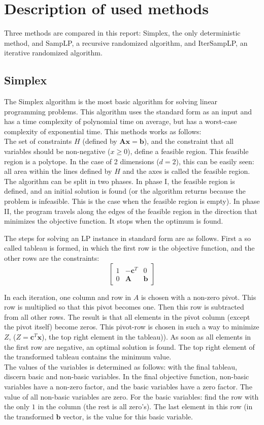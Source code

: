 \documentclass[nocopyrightspace]{acm_proc_article-sp}
\begin{document}
\section{Description of used methods}
Three methods are compared  in this report: Simplex, the only deterministic method, and SampLP, a recursive randomized algorithm, and IterSampLP, an iterative randomized algorithm.
\subsection{Simplex}
The Simplex algorithm \cite{dantzig1951maximization} is the most basic algorithm for solving linear programming problems. This algorithm uses the standard form as an input and has a time complexity of polynomial time on average, but has a worst-case complexity of exponential time. This methods works as follows: \\
The set of constraints $H$ (defined by $\mathbf{Ax} = \mathbf{b}$), and the constraint that all variables should be non-negative ($x \geq 0$), define a feasible region. This feasible region is a polytope. In the case of 2 dimensions ($d=2$), this can be easily seen: all area within the lines defined by $H$ and the axes is called the feasible region. \\
The algorithm can be split in two phases. In phase I, the feasible region is defined, and an initial solution is found (or the algorithm returns because the problem is infeasible. This is the case when the feasible region is empty). In phase II, the program travels along the edges of the feasible region in the direction that minimizes the objective function. It stops when the optimum is found.

The steps for solving an LP instance in standard form are as follows. First a so called tableau is formed, in which the first row is the objective function, and the other rows are the constraints:
\[
\begin{bmatrix}
1 & -\mathbf{c}^T & 0 \\
0 & \mathbf{A} & \mathbf{b}
\end{bmatrix} \]

In each iteration, one column and row in $A$ is chosen with a non-zero pivot. This row is multiplied so that this pivot becomes one. Then this row is subtracted from all other rows. The result is that all elements in the pivot column (except the pivot itself) become zeros. This pivot-row is chosen in such a way to minimize $Z$, ($Z = \mathbf{c}^T \mathbf{x}$), the top right element in the tableau)). As soon as all elements in the first row are negative, an optimal solution is found. The top right element of the transformed tableau contains the minimum value. \\
The values of the variables is determined as follows: with the final tableau, discern basic and non-basic variables. In the final objective function, non-basic variables have a non-zero factor, and the basic variables have a zero factor. The value of all non-basic variables are zero. For the basic variables: find the row with the only $1$ in the column (the rest is all zero's). The last element in this row (in the transformed $\mathbf{b}$ vector, is the value for this basic variable.
\end{document}
